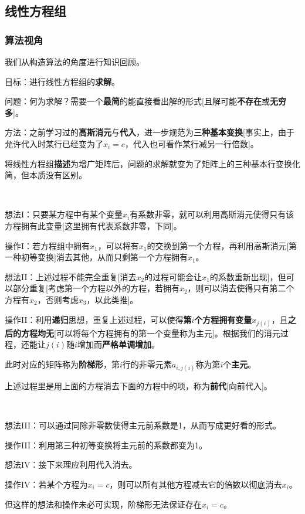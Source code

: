\documentclass[a4paper,UTF8,fontset=windows]{ctexart}
\newcommand*{\note}{\noindent *}
\begin{document}
\subsection{线性方程组}
\subsubsection{算法视角}
我们从构造算法的角度进行知识回顾。

目标：进行线性方程组的\textbf{求解}。

问题：何为求解？需要一个\textbf{最简}的能直接看出解的形式[且解可能\textbf{不存在}或\textbf{无穷多}]。

方法：之前学习过的\textbf{高斯消元}与\textbf{代入}，进一步规范为\textbf{三种基本变换}[事实上，由于允许代入时某行已经变为了$x_i=c$，代入也可看作某行减另一行倍数]。

\note 将线性方程组\textbf{描述}为增广矩阵后，问题的求解就变为了矩阵上的三种基本行变换化简，但本质没有区别。

\

想法I：只要某方程中有某个变量$x_i$有系数非零，就可以利用高斯消元使得只有该方程拥有此变量[这里拥有代表系数非零，下同]。

操作I：若方程组中拥有$x_1$，可以将有$x_1$的交换到第一个方程，再利用高斯消元[第一种初等变换]消去其他，从而只剩第一个方程拥有$x_1$。

想法II：上述过程不能完全重复[消去$x_2$的过程可能会让$x_1$的系数重新出现]，但可以部分重复[考虑第一个方程以外的方程，若拥有$x_2$，则可以消去使得只有第二个方程有$x_2$，否则考虑$x_3$，以此类推]。

操作II：利用\textbf{递归}思想，重复上述过程，可以使得\textbf{第$i$个方程拥有变量$x_{j(i)}$}，且\textbf{之后的方程均无}[可以将每个方程拥有的第一个变量称为主元]。根据我们的消元过程，还能让$j(i)$随$i$增加而\textbf{严格单调增加}。

\note 此时对应的矩阵称为\textbf{阶梯形}，第$i$行的非零元素$a_{i,j(i)}$称为第$i$个\textbf{主元}。

\note 上述过程里是用上面的方程消去下面的方程中的项，称为\textbf{前代}[向前代入]。

\

想法III：可以通过同除非零数使得主元前系数是1，从而写成更好看的形式。

操作III：利用第三种初等变换将主元前的系数都变为1。

想法IV：接下来理应利用代入消去。

操作IV：若某个方程为$x_i=c$，则可以所有其他方程减去它的倍数以彻底消去$x_i$。

\note 但这样的想法和操作未必可实现，阶梯形无法保证存在$x_i=c$。
\end{document}
